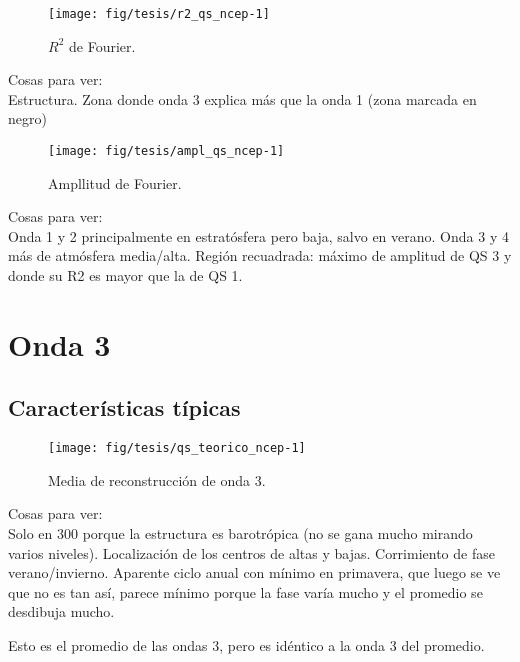 \documentclass[spanish,a4paper]{book}
\begin{document}
\begin{figure}

{\centering \texttt{[image: fig/tesis/r2\_qs\_ncep-1]} 

}

\caption{$R^2$ de Fourier.}\label{fig:r2_qs_ncep}
\end{figure}

Cosas para ver:\\
Estructura. Zona donde onda 3 explica más que la onda 1 (zona marcada en
negro)

\begin{figure}

{\centering \texttt{[image: fig/tesis/ampl\_qs\_ncep-1]} 

}

\caption{Ampllitud de Fourier.}\label{fig:ampl_qs_ncep}
\end{figure}

Cosas para ver:\\
Onda 1 y 2 principalmente en estratósfera pero baja, salvo en verano.
Onda 3 y 4 más de atmósfera media/alta. Región recuadrada: máximo de
amplitud de QS 3 y donde su R2 es mayor que la de QS 1.

\chapter{Onda 3}\label{onda-3}

\section{Características típicas}\label{caracteristicas-tipicas}

\begin{figure*}
\texttt{[image: fig/tesis/qs\_teorico\_ncep-1]} \caption{Media de reconstrucción de onda 3.}\label{fig:qs_teorico_ncep}
\end{figure*}

Cosas para ver:\\
Solo en 300 porque la estructura es barotrópica (no se gana mucho
mirando varios niveles). Localización de los centros de altas y bajas.
Corrimiento de fase verano/invierno. Aparente ciclo anual con mínimo en
primavera, que luego se ve que no es tan así, parece mínimo porque la
fase varía mucho y el promedio se desdibuja mucho.

Esto es el promedio de las ondas 3, pero es idéntico a la onda 3 del
promedio.
\end{document}
